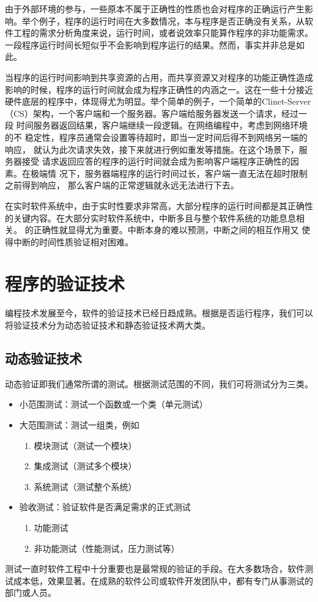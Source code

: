 由于外部环境的参与，一些原本不属于正确性的性质也会对程序的正确运行产生影
响。举个例子，程序的运行时间在大多数情况，本与程序是否正确没有关系，从软
件工程的需求分析角度来说，运行时间，或者说效率只能算作程序的非功能需求。
一段程序运行时间长短似乎不会影响到程序运行的结果。然而，事实并非总是如此。

当程序的运行时间影响到共享资源的占用，而共享资源又对程序的功能正确性造成
影响的时候，程序的运行时间就会成为程序正确性的内涵之一。这在一些十分接近
硬件底层的程序中，体现得尤为明显。举个简单的例子，一个简单的Clinet-Server
（CS）架构，一个客户端和一个服务器。客户端给服务器发送一个请求，经过一段
时间服务器返回结果，客户端继续一段逻辑。在网络编程中，考虑到网络环境的不
稳定性，程序员通常会设置等待超时，即当一定时间后得不到网络另一端的响应，
就认为此次请求失效，接下来就进行例如重发等措施。在这个场景下，服务器接受
请求返回应答的程序的运行时间就会成为影响客户端程序正确性的因素。在极端情
况下，服务器端程序的运行时间过长，客户端一直无法在超时限制之前得到响应，
那么客户端的正常逻辑就永远无法进行下去。

在实时软件系统中，由于实时性要求非常高，大部分程序的运行时间都是其正确性
的关键内容。在大部分实时软件系统中，中断多且与整个软件系统的功能息息相关。
的正确性就显得尤为重要。中断本身的难以预测，中断之间的相互作用又
使得中断的时间性质验证相对困难。

\section{程序的验证技术}
\label{sec:verification}
编程技术发展至今，软件的验证技术已经日趋成熟。根据是否运行程序，我们可以
将验证技术分为动态验证技术和静态验证技术两大类。

\subsection{动态验证技术}
\label{subsec:dynamic}
动态验证即我们通常所谓的测试。根据测试范围的不同，我们可将测试分为三类。
\cite{SWEBOK}
\begin{itemize}
	\item 小范围测试：测试一个函数或一个类（单元测试）
	\item 大范围测试：测试一组类，例如
	\begin{enumerate}[(1)]
		\item 模块测试（测试一个模块）
		\item 集成测试（测试多个模块）
		\item 系统测试（测试整个系统）
	\end{enumerate}
	\item 验收测试：验证软件是否满足需求的正式测试
	\begin{enumerate}[(1)]
		\item 功能测试
		\item 非功能测试（性能测试，压力测试等）
	\end{enumerate}		
\end{itemize}
测试一直时软件工程中十分重要也是最常规的验证的手段。在大多数场合，软件测
试成本低，效果显著。在成熟的软件公司或软件开发团队中，都有专门从事测试的
部门或人员。

